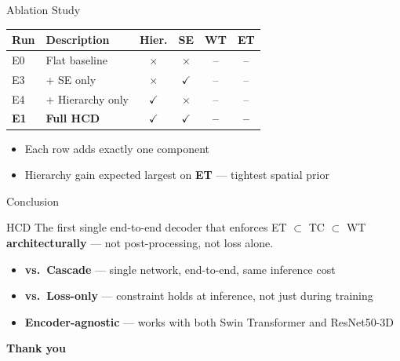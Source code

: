 \documentclass[aspectratio=169]{beamer}
\begin{document}
\begin{frame}{Ablation Study}
  \vspace{0.3em}
  \begin{center}
  \begin{tabular}{llcccc}
    \toprule
    \textbf{Run} & \textbf{Description} & \textbf{Hier.} & \textbf{SE} & \textbf{WT} & \textbf{ET} \\
    \midrule
    E0           & Flat baseline    & $\times$     & $\times$     & -- & -- \\
    E3           & + SE only        & $\times$     & $\checkmark$ & -- & -- \\
    E4           & + Hierarchy only & $\checkmark$ & $\times$     & -- & -- \\
    \textbf{E1}  & \textbf{Full HCD}& $\checkmark$ & $\checkmark$ & \textbf{--} & \textbf{--} \\
    \bottomrule
  \end{tabular}
  \end{center}

  \vspace{1em}
  \begin{itemize}
    \setlength\itemsep{0.5em}
    \item Each row adds exactly one component
    \item Hierarchy gain expected largest on \textbf{ET} — tightest spatial prior
  \end{itemize}
\end{frame}

\begin{frame}{Conclusion}
  \vspace{0.5em}
  \begin{block}{HCD}
    The first single end-to-end decoder that enforces ET $\subset$ TC $\subset$ WT
    \textbf{architecturally} — not post-processing, not loss alone.
  \end{block}

  \vspace{1.2em}
  \begin{itemize}
    \setlength\itemsep{0.8em}
    \item \textbf{vs.\ Cascade} — single network, end-to-end, same inference cost
    \item \textbf{vs.\ Loss-only} — constraint holds at inference, not just during training
    \item \textbf{Encoder-agnostic} — works with both Swin Transformer and ResNet50-3D
  \end{itemize}

  \vspace{1.5em}
  \begin{center}
    \large\textbf{Thank you}
  \end{center}
\end{frame}
\end{document}

